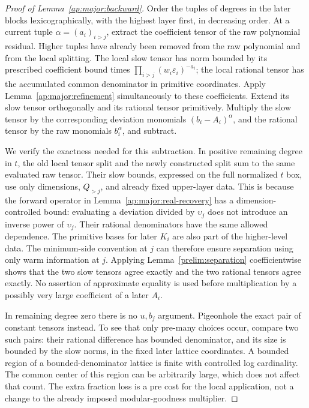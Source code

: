\begin{proof}[Proof of Lemma~\ref{ap:major:backward}]
Order the tuples of degrees in the later blocks lexicographically,
with the highest layer first, in decreasing order.  At a current
tuple $\alpha=(a_i)_{i>j}$, extract the coefficient tensor of the
raw polynomial residual.  Higher tuples have already been removed
from the raw polynomial and from the local splitting.  The local
slow tensor has norm bounded by its prescribed coefficient bound
times $\prod_{i>j}(w_i\varepsilon_i)^{-a_i}$; the local rational
tensor has the accumulated common denominator in primitive
coordinates.  Apply Lemma~\ref{ap:major:refinement} simultaneously
to these coefficients.  Extend its slow tensor orthogonally and its
rational tensor primitively.  Multiply the slow tensor by the
corresponding deviation monomials $(b_i-A_i)^\alpha$, and the rational
tensor by the raw monomials $b_i^\alpha$, and subtract.

We verify the exactness needed for this subtraction.  In positive
remaining degree in $t$, the old local tensor split and the newly
constructed split sum to the same evaluated raw tensor.  Their
slow bounds, expressed on the full normalized $t$ box, use only
dimensions, $Q_{>j}$, and already fixed upper-layer data.  This is
because the forward operator in Lemma~\ref{ap:major:real-recovery}
has a dimension-controlled bound: evaluating a deviation divided
by $\upsilon_j$ does not introduce an inverse power of $\upsilon_j$.  Their
rational denominators have the same allowed dependence.  The
primitive bases for later $K_i$ are also part of the higher-level
data.  The minimum-side convention at $j$ can therefore ensure
separation using only warm information at $j$.  Applying
Lemma~\ref{prelim:separation} coefficientwise shows that the two
slow tensors agree exactly and the two rational tensors agree
exactly.  No assertion of approximate equality is used before
multiplication by a possibly very large coefficient of a later
$A_i$.

In remaining degree zero there is no $u,b_j$ argument.  Pigeonhole
the exact pair of constant tensors instead.  To see that only
pre-many choices occur, compare two such pairs: their rational
difference has bounded denominator, and its size is bounded by
the slow norms, in the fixed later lattice coordinates.  A bounded
region of a bounded-denominator lattice is finite with controlled
log cardinality.  The common center of this region can be arbitrarily
large, which does not affect that count.  The extra fraction loss
is a pre cost for the local application, not a change to the
already imposed modular-goodness multiplier.


\end{proof}
